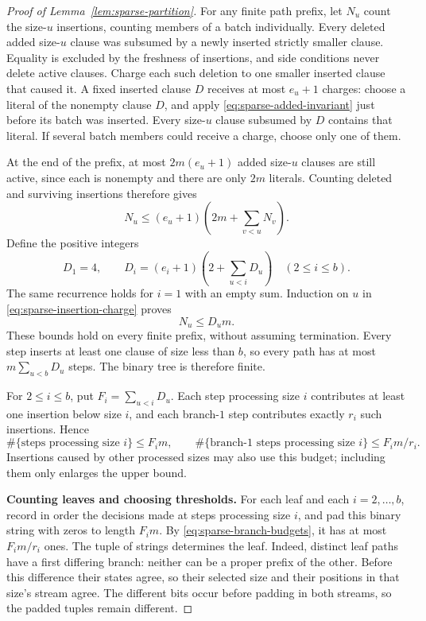 \begin{proof}[Proof of Lemma~\ref{lem:sparse-partition}]
For any finite path prefix, let $N_u$ count the size-$u$ insertions,
counting members of a batch individually.  Every deleted added size-$u$
clause was subsumed by a newly inserted strictly smaller clause.
Equality is excluded by the freshness of insertions, and side
conditions never delete active clauses.  Charge each such deletion to
one smaller inserted clause that caused it.  A fixed inserted clause
$D$ receives at most $e_u+1$ charges: choose a literal of the nonempty
clause $D$, and apply \eqref{eq:sparse-added-invariant} just before its
batch was inserted.  Every size-$u$ clause subsumed by $D$ contains that
literal.  If several batch members could receive a charge, choose only
one of them.

At the end of the prefix, at most $2m(e_u+1)$ added size-$u$ clauses are
still active, since each is nonempty and there are only $2m$ literals.
Counting deleted and surviving insertions therefore gives
\begin{equation}\label{eq:sparse-insertion-charge}
 N_u\le(e_u+1)\left(2m+\sum_{v<u}N_v\right).
\end{equation}
Define the positive integers
\begin{equation}\label{eq:sparse-constants}
 D_1=4,\qquad
 D_i=(e_i+1)\left(2+\sum_{u<i}D_u\right)\quad(2\le i\le b).
\end{equation}
The same recurrence holds for $i=1$ with an empty sum.  Induction on
$u$ in \eqref{eq:sparse-insertion-charge} proves
\begin{equation}\label{eq:sparse-insertion-budget}
 N_u\le D_um.
\end{equation}
These bounds hold on every finite prefix, without assuming termination.
Every step inserts at least one clause of size less than $b$, so every
path has at most $m\sum_{u<b}D_u$ steps.  The binary tree is therefore
finite.

For $2\le i\le b$, put $F_i=\sum_{u<i}D_u$.  Each step processing size
$i$ contributes at least one insertion below size $i$, and each
branch-$1$ step contributes exactly $r_i$ such insertions.  Hence
\begin{equation}\label{eq:sparse-branch-budgets}
 \#\{\text{steps processing size }i\}\le F_im,\qquad
 \#\{\text{branch-$1$ steps processing size }i\}\le F_im/r_i.
\end{equation}
Insertions caused by other processed sizes may also use this budget;
including them only enlarges the upper bound.

\medskip\noindent
\textbf{Counting leaves and choosing thresholds.}
For each leaf and each $i=2,\ldots,b$, record in order the decisions made
at steps processing size $i$, and pad this binary string with zeros to
length $F_im$.  By \eqref{eq:sparse-branch-budgets}, it has at most
$F_im/r_i$ ones.  The tuple of strings determines the leaf.  Indeed,
distinct leaf paths have a first differing branch: neither can be a
proper prefix of the other.  Before this difference their states agree,
so their selected size and their positions in that size's stream agree.
The different bits occur before padding in both streams, so the padded
tuples remain different.


\end{proof}
